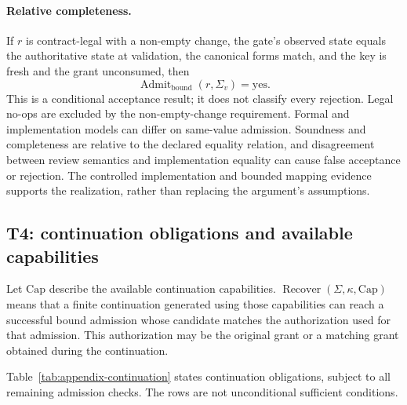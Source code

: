 \paragraph{Relative completeness.}
If $r$ is contract-legal with a non-empty change, the gate's observed state equals the authoritative state at validation, the canonical forms match, and the key is fresh and the grant unconsumed, then
\[
 \operatorname{Admit}_{\mathrm{bound}}(r,\Sigma_v)=\mathrm{yes}.
\]
This is a conditional acceptance result; it does not classify every rejection. Legal no-ops are excluded by the non-empty-change requirement. Formal and implementation models can differ on same-value admission. Soundness and completeness are relative to the declared equality relation, and disagreement between review semantics and implementation equality can cause false acceptance or rejection. The controlled implementation and bounded mapping evidence supports the realization, rather than replacing the argument's assumptions.

\subsection{T4: continuation obligations and available capabilities}
\label{app:t4}
Let $\mathrm{Cap}$ describe the available continuation capabilities.
$\operatorname{Recover}(\Sigma,\kappa,\mathrm{Cap})$ means that a finite continuation generated using those capabilities can reach a successful bound admission whose candidate matches the authorization used for that admission. This authorization may be the original grant or a matching grant obtained during the continuation.

Table~\ref{tab:appendix-continuation} states continuation obligations, subject to all remaining admission checks. The rows are not unconditional sufficient conditions.

